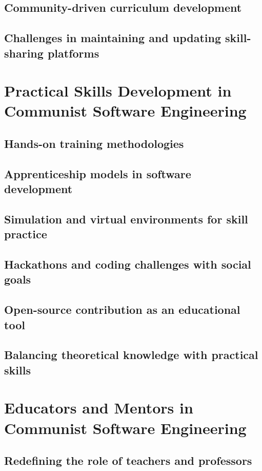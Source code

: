 \subsection{Community-driven curriculum development}
\subsection{Challenges in maintaining and updating skill-sharing platforms}

\newpage

\section{Practical Skills Development in Communist Software Engineering}
\subsection{Hands-on training methodologies}
\subsection{Apprenticeship models in software development}
\subsection{Simulation and virtual environments for skill practice}
\subsection{Hackathons and coding challenges with social goals}
\subsection{Open-source contribution as an educational tool}
\subsection{Balancing theoretical knowledge with practical skills}

\newpage

\section{Educators and Mentors in Communist Software Engineering}
\subsection{Redefining the role of teachers and professors}
